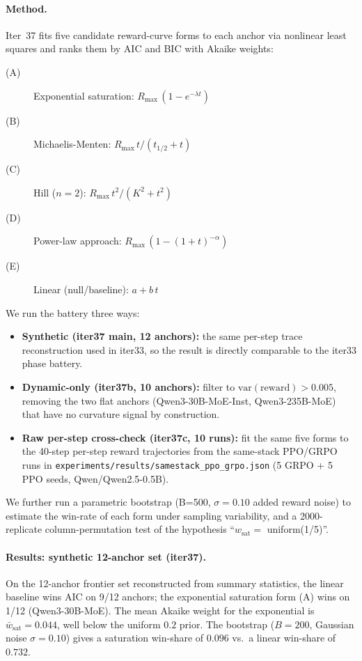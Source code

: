 \documentclass{article}
\begin{document}
\paragraph{Method.}
Iter~37 fits five candidate reward-curve forms to each anchor via
nonlinear least squares and ranks them by AIC and BIC with Akaike
weights:
\begin{description}
\item[(A)] Exponential saturation: $R_{\max}\,(1 - e^{-\lambda t})$
\item[(B)] Michaelis-Menten: $R_{\max}\,t/(t_{1/2} + t)$
\item[(C)] Hill ($n=2$): $R_{\max}\,t^2/(K^2 + t^2)$
\item[(D)] Power-law approach: $R_{\max}\,(1 - (1 + t)^{-\alpha})$
\item[(E)] Linear (null/baseline): $a + b\,t$
\end{description}
We run the battery three ways:
\begin{itemize}
\item \textbf{Synthetic (iter37 main, 12 anchors):} the same per-step
  trace reconstruction used in iter33, so the result is directly
  comparable to the iter33 phase battery.
\item \textbf{Dynamic-only (iter37b, 10 anchors):} filter to
  $\mathrm{var}(\mathrm{reward}) > 0.005$, removing the two flat
  anchors (Qwen3-30B-MoE-Inst, Qwen3-235B-MoE) that have no curvature
  signal by construction.
\item \textbf{Raw per-step cross-check (iter37c, 10 runs):} fit the
  same five forms to the 40-step per-step reward trajectories from
  the same-stack PPO/GRPO runs in
  \texttt{experiments/results/samestack\_ppo\_grpo.json}
  (5 GRPO + 5 PPO seeds, Qwen/Qwen2.5-0.5B).
\end{itemize}
We further run a parametric bootstrap (B=500, $\sigma=0.10$ added
reward noise) to estimate the win-rate of each form under sampling
variability, and a 2000-replicate column-permutation test of the
hypothesis ``$w_{\mathrm{sat}} = $ uniform(1/5)''.

\paragraph{Results: synthetic 12-anchor set (iter37).}
On the 12-anchor frontier set reconstructed from summary statistics,
the linear baseline wins AIC on 9/12 anchors; the exponential
saturation form (A) wins on 1/12 (Qwen3-30B-MoE). The mean Akaike
weight for the exponential is $\bar{w}_{\mathrm{sat}} = 0.044$, well
below the uniform $0.2$ prior. The bootstrap
($B{=}200$, Gaussian noise $\sigma{=}0.10$) gives a saturation
win-share of $0.096$ vs.\ a linear win-share of $0.732$.
\end{document}
